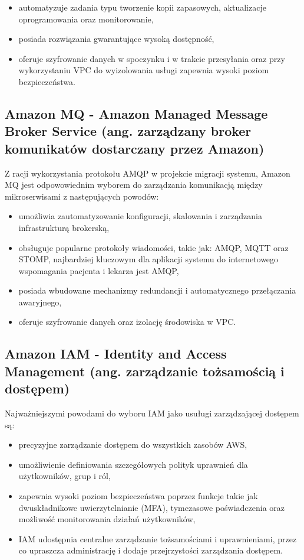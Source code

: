 \documentclass[12pt,twoside]{book}
\begin{document}
    \begin{itemize}
        \item automatyzuje zadania typu tworzenie kopii zapasowych, aktualizacje oprogramowania oraz monitorowanie,
        \item posiada rozwiązania gwarantujące wysoką dostępność,
        \item oferuje szyfrowanie danych w spoczynku i w trakcie przesyłania oraz przy wykorzystaniu VPC do wyizolowania usługi zapewnia wysoki poziom bezpieczeństwa. \cite{aws.rds}
    \end{itemize}

    \subsection{Amazon MQ - Amazon Managed Message Broker Service  (ang. zarządzany broker komunikatów dostarczany przez Amazon)}
    Z racji wykorzystania protokołu AMQP w projekcie migracji systemu, Amazon MQ jest odpowowiednim wyborem do zarządzania komunikacją między mikroserwisami z następujących powodów:

    \begin{itemize}
        \item umożliwia zautomatyzowanie konfiguracji, skalowania i zarządzania infrastrukturą brokerską,
        \item obsługuje popularne protokoły wiadomości, takie jak: AMQP, MQTT oraz STOMP, najbardziej kluczowym dla aplikacji systemu do internetowego wspomagania pacjenta i lekarza jest AMQP,
        \item posiada wbudowane mechanizmy redundancji i automatycznego przełączania awaryjnego,
        \item oferuje szyfrowanie danych oraz izolację środowiska w VPC. \cite{aws.mq}
    \end{itemize}

    \subsection{Amazon IAM - Identity and Access Management (ang. zarządzanie tożsamością i dostępem)}
    Najważniejszymi powodami do wyboru IAM jako usuługi zarządzającej dostępem są:

    \begin{itemize}
        \item precyzyjne zarządzanie dostępem do wszystkich zasobów AWS,
        \item umożliwienie definiowania szczegółowych polityk uprawnień dla użytkowników, grup i ról,
        \item zapewnia wysoki poziom bezpieczeństwa poprzez funkcje takie jak dwuskładnikowe uwierzytelnianie (MFA), tymczasowe poświadczenia oraz możliwość monitorowania działań użytkowników,
        \item IAM udostępnia centralne zarządzanie tożsamościami i uprawnieniami, przez co upraszcza administrację i dodaje przejrzystości zarządzania dostępem. \cite{aws.iam}
    \end{itemize}
\end{document}

